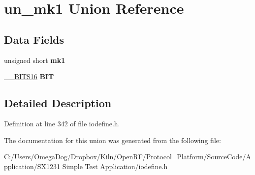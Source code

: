 \hypertarget{unionun__mk1}{\section{un\-\_\-mk1 Union Reference}
\label{unionun__mk1}
}
\subsection*{Data Fields}
\begin{DoxyCompactItemize}
\item 
\hypertarget{unionun__mk1_ac88524fd8a511cf8a69603e25dfe3066}{unsigned short {\bfseries mk1}}\label{unionun__mk1_ac88524fd8a511cf8a69603e25dfe3066}

\item 
\hypertarget{unionun__mk1_a0cf26ed6b612a34ae122f6101c95ce0f}{\hyperlink{struct_____b_i_t_s16}{\-\_\-\-\_\-\-B\-I\-T\-S16} {\bfseries B\-I\-T}}\label{unionun__mk1_a0cf26ed6b612a34ae122f6101c95ce0f}

\end{DoxyCompactItemize}


\subsection{Detailed Description}


Definition at line 342 of file iodefine.\-h.



The documentation for this union was generated from the following file\-:\begin{DoxyCompactItemize}
\item 
C\-:/\-Users/\-Omega\-Dog/\-Dropbox/\-Kiln/\-Open\-R\-F/\-Protocol\-\_\-\-Platform/\-Source\-Code/\-Application/\-S\-X1231 Simple Test Application/iodefine.\-h\end{DoxyCompactItemize}
